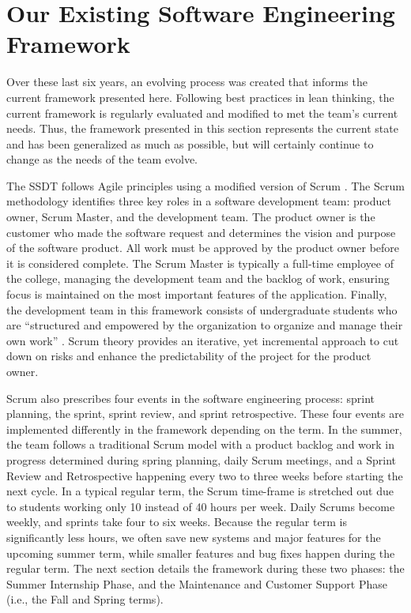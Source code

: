 \section{Our Existing Software Engineering Framework}

Over these last six years, an evolving process was created that informs the current framework presented here. Following best practices in lean thinking, the current framework is regularly evaluated and modified to met the team's current needs. Thus, the framework presented in this section represents the current state and has been generalized as much as possible, but will certainly continue to change as the needs of the team evolve.

The SSDT follows Agile principles \cite{agilemanifesto} using a modified version of Scrum \cite{thescrumguide}. The Scrum methodology identifies three key roles in a software development team: product owner, Scrum Master, and the development team. The product owner is the customer who made the software request and determines the vision and purpose of the software product. All work must be approved by the product owner before it is considered complete. The Scrum Master is typically a full-time employee of the college, managing the development team and the backlog of work, ensuring focus is maintained on the most important features of the application. Finally, the development team in this framework consists of undergraduate students who are ``structured and empowered by the organization to organize and manage their own work'' \cite{thescrumguide}. Scrum theory provides an iterative, yet incremental approach to cut down on risks and enhance the predictability of the project for the product owner.

Scrum also prescribes four events in the software engineering process: sprint planning, the sprint, sprint review, and sprint retrospective. These four events are implemented differently in the framework depending on the term. In the summer, the team follows a traditional Scrum model with a product backlog and work in progress determined during spring planning, daily Scrum meetings, and a Sprint Review and Retrospective happening every two to three weeks before starting the next cycle. In a typical regular term, the Scrum time-frame is stretched out due to students working only 10 instead of 40 hours per week. Daily Scrums become weekly, and sprints take four to six weeks. Because the regular term is significantly less hours, we often save new systems and major features for the upcoming summer term, while smaller features and bug fixes happen during the regular term. The next section details the framework during these two phases: the Summer Internship Phase, and the Maintenance and Customer Support Phase (i.e., the Fall and Spring terms).

